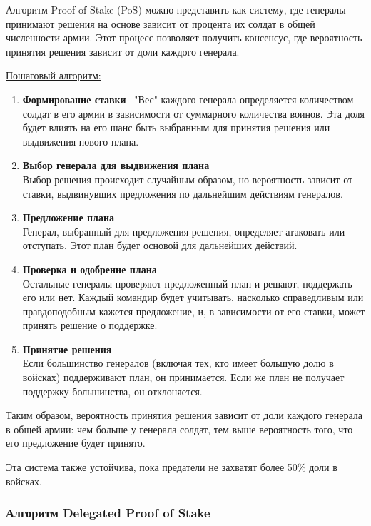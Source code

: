 \hspace{1.25cm}
Алгоритм Proof of Stake (PoS) можно представить как систему, где генералы принимают решения на основе зависит от процента их солдат в общей численности армии. Этот процесс позволяет получить консенсус, где вероятность принятия решения зависит от доли каждого генерала.

\underline{Пошаговый алгоритм:}

\begin{enumerate}
	\item \textbf{Формирование ставки} \ "Вес" каждого генерала определяется количеством солдат в его армии в зависимости от суммарного количества воинов. Эта доля будет влиять на его шанс быть выбранным для принятия решения или выдвижения нового плана.

	\item \textbf{Выбор генерала для выдвижения плана}\\
Выбор решения происходит случайным образом, но вероятность зависит от ставки, выдвинувших предложения по дальнейшим действиям генералов.

	\item \textbf{Предложение плана} \\
Генерал, выбранный для предложения решения, определяет атаковать или отступать. Этот план будет основой для дальнейших действий.

	\item \textbf{Проверка и одобрение плана} \\
Остальные генералы проверяют предложенный план и решают, поддержать его или нет. Каждый командир будет учитывать, насколько справедливым или правдоподобным кажется предложение, и, в зависимости от его ставки, может принять решение о поддержке.

	\item \textbf{Принятие решения} \\
Если большинство генералов (включая тех, кто имеет большую долю в войсках) поддерживают план, он принимается. Если же план не получает поддержку большинства, он отклоняется.
\end{enumerate}

Таким образом, вероятность принятия решения зависит от доли каждого генерала в общей армии: чем больше у генерала солдат, тем выше вероятность того, что его предложение будет принято.

Эта система также устойчива, пока предатели не захватят более 50\% доли в войсках.~\cite{forklog_PoS}


\subsubsection{Алгоритм Delegated Proof of Stake}

